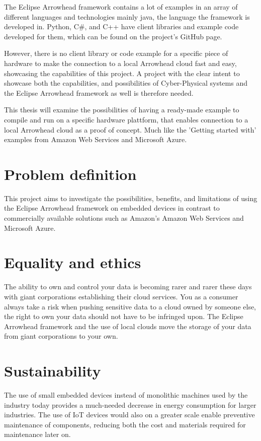 The Eclipse Arrowhead framework contains a lot of examples in an array of different languages and technologies mainly java, the language the framework is developed in. 
Python, C\#, and C++ have client libraries and example code developed for them, which can be found on the project's GitHub page.\cite{AC2021} 

However, there is no client library or code example for a specific piece of hardware to make the connection to a local Arrowhead cloud fast and easy, showcasing the capabilities of this project. 
A project with the clear intent to showcase both the capabilities, and possibilities of Cyber-Physical systems and the Eclipse Arrowhead framework as well is therefore needed.

This thesis will examine the possibilities of having a ready-made example to compile and run on a specific hardware plattform, that enables connection to a local Arrowhead cloud as a proof of concept. 
Much like the 'Getting started with' examples from Amazon Web Services and Microsoft Azure.\cite{Guide2020,AZURE2021}
\section{Problem definition}
This project aims to investigate the possibilities, benefits, and limitations of using the Eclipse Arrowhead framework on embedded devices in contrast to commercially available solutions such
as Amazon's Amazon Web Services and Microsoft Azure. 
\section{Equality and ethics}
The ability to own and control your data is becoming rarer and rarer these days with giant corporations establishing their cloud services.
You as a consumer always take a risk when pushing sensitive data to a cloud owned by someone else, the right to own your data should not have to be infringed upon. 
The Eclipse Arrowhead framework and the use of local clouds move the storage of your data from giant corporations to your own.
\section{Sustainability}
The use of small embedded devices instead of monolithic machines used by the industry today provides a much-needed decrease in energy consumption for larger industries.
The use of IoT devices would also on a greater scale enable preventive maintenance of components, reducing both the cost and materials required for maintenance later on.
